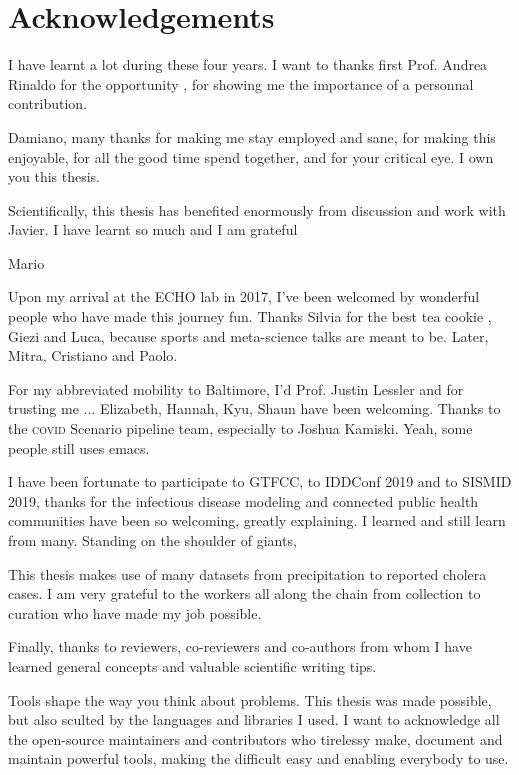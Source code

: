 


  \chapter*{Acknowledgements} 
 
 I have learnt a lot during these four years. I want to thanks first Prof. Andrea Rinaldo for the opportunity , for showing me the importance of a personnal contribution.  
 
 Damiano, many thanks for making me stay employed and sane, for making this enjoyable, for all the good time spend together, and for your critical eye. I own you this thesis.
 
 Scientifically, this thesis has benefited enormously from discussion and work with Javier. I have learnt so much and I am grateful
 
 Mario
 
 Upon my arrival at the ECHO lab in 2017, I've been welcomed by wonderful people who have made this journey fun. Thanks Silvia for the best tea cookie , Giezi and Luca, because sports and meta-science talks are meant to be. Later, Mitra, Cristiano and Paolo.
 
 
 For my abbreviated mobility to Baltimore, I'd Prof. Justin Lessler and for trusting me  ... Elizabeth, Hannah, Kyu, Shaun have been welcoming. Thanks to the \textsc{covid} Scenario pipeline team, especially to Joshua Kamiski. Yeah, some people still uses emacs.
 
 I have been fortunate to participate to GTFCC, to IDDConf 2019 and to SISMID 2019, thanks for the infectious disease modeling and connected public health communities have been so welcoming, greatly explaining. I learned and still learn from many. Standing on the shoulder of giants, 
 
 This thesis makes use of many datasets from precipitation to reported cholera cases. I am very grateful to the workers all along the chain from collection to curation who have made my job possible.
 
 Finally, thanks to reviewers, co-reviewers and co-authors from whom I have learned general concepts and valuable scientific writing tips.
 
Tools shape the way you think about problems. This thesis was made possible, but also sculted by the languages and libraries I used. I want to acknowledge all the open-source maintainers and contributors who tirelessy make, document and maintain powerful tools, making the difficult easy and enabling everybody to use.

